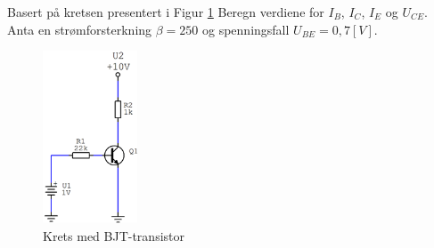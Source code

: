 \begin{question}[name=Oppgave, topic=transBJT]
	Basert på kretsen presentert i Figur \ref{fig:tranBJT2} Beregn verdiene for $I_B$, $I_C$, $I_E$ og $U_{CE}$. Anta en strømforsterkning $\beta=250$ og spenningsfall $U_{BE}=0,7[V]$.
	
	\begin{figure}[H]
		\centering
		\includegraphics[width=0.25\textwidth]{transistor-BJT/figurer/krets2.png}
		\caption{Krets med BJT-transistor}
		\label{fig:tranBJT2}
	\end{figure}
	
\end{question}

\vspace{0.5cm} %


